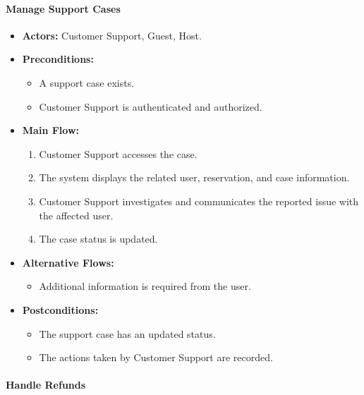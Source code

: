 \paragraph{Manage Support Cases}

\begin{itemize}
    \item \textbf{Actors:} Customer Support, Guest, Host.
    
    \item \textbf{Preconditions:}
    \begin{itemize}
        \item A support case exists.
        \item Customer Support is authenticated and authorized.
    \end{itemize}
    
    \item \textbf{Main Flow:}
    \begin{enumerate}
        \item Customer Support accesses the case.
        \item The system displays the related user, reservation, and case information.
        \item Customer Support investigates and communicates the reported issue with the affected
              user.
        \item The case status is updated.
    \end{enumerate}
    
    \item \textbf{Alternative Flows:}
    \begin{itemize}
        \item Additional information is required from the user.
    \end{itemize}
    
    \item \textbf{Postconditions:}
    \begin{itemize}
        \item The support case has an updated status.
        \item The actions taken by Customer Support are recorded.
    \end{itemize}
\end{itemize}


\paragraph{Handle Refunds}

